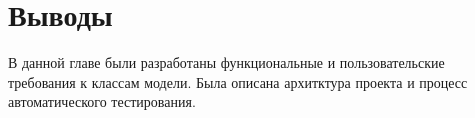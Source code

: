 




\section{Выводы}
В данной главе были разработаны функциональные и пользовательские требования к классам модели.
Была описана архитктура проекта и процесс автоматического тестирования.
